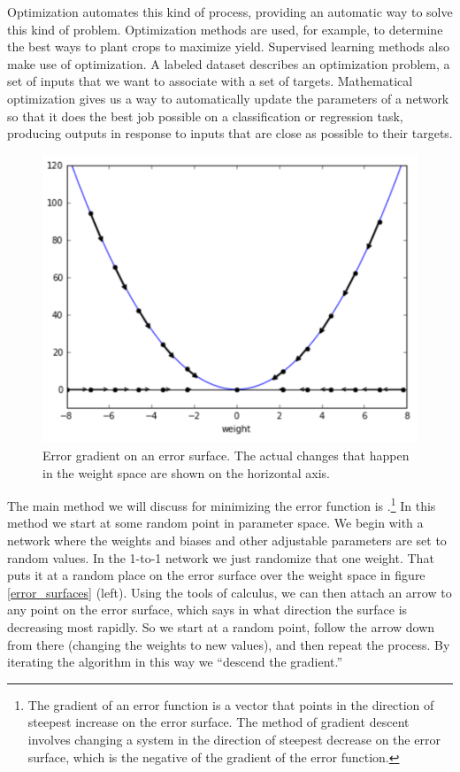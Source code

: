 Optimization automates this kind of process, providing an automatic way to solve this kind of problem. Optimization methods are used, for example, to determine the best ways to plant crops to maximize yield. Supervised learning methods also make use of optimization. A labeled dataset describes an optimization problem, a set of inputs that we want to associate with a set of targets. Mathematical optimization gives us a way to automatically update the parameters of a network so that it does the best job possible on a classification or regression task, producing outputs in response to inputs that are close as possible to their targets.

\begin{figure}[h]
\centering
\includegraphics[scale=.5]{./images/GradientDescent.png}
\caption[Jeff Yoshimi.]{Error gradient on an error surface. The actual changes that happen in the weight space are shown on the horizontal axis.}
\label{gradient_descent}
\end{figure}

The main method we will discuss for minimizing the error function is  .\footnote{The gradient of an error function is a vector that points in the direction of steepest increase on the error surface. The method of gradient descent involves changing a system in the direction of steepest decrease on the error surface, which is the negative of the gradient of the error function.}  In this method we start at some random point in parameter space. We begin with a network where the weights and biases and other adjustable parameters are set to random values. In the 1-to-1 network we just randomize that one weight. That puts it at a random place on the error surface over the weight space in figure \ref{error_surfaces} (left). Using the tools of calculus, we can then attach an arrow to any point on the error surface, which says in what direction the surface is decreasing most rapidly. So we start at a random point, follow the arrow down from there (changing the weights to new values), and then repeat the process. By iterating the algorithm in this way we ``descend the gradient.''

